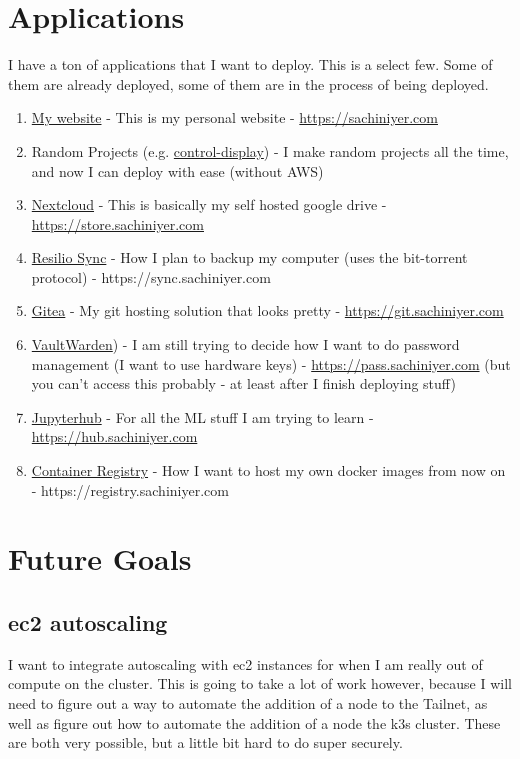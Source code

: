 \documentclass[12pt]{article}
\begin{document}
\section{Applications}
I have a ton of applications that I want to deploy. This is a select few. Some of them are already deployed, some of them are in the process of being deployed.
\begin{enumerate}
    \item \href{https://sachiniyer.com}{My website} - This is my personal website - \href{https://sachiniyer.com}{https://sachiniyer.com}
    \item Random Projects (e.g. \href{https://school-demo.sachiniyer.com}{control-display}) - I make random projects all the time, and now I can deploy with ease (without AWS)
    \item \href{https://nextcloud.com}{Nextcloud} - This is basically my self hosted google drive - \href{https://store.sachiniyer.com}{https://store.sachiniyer.com}
    \item \href{https://resilio.com}{Resilio Sync} - How I plan to backup my computer (uses the bit-torrent protocol) - https://sync.sachiniyer.com
    \item \href{https://gitea.io}{Gitea} - My git hosting solution that looks pretty - \href{https://git.sachiniyer.com}{https://git.sachiniyer.com}
    \item \href{https://github.com/dani-garcia/vaultwarden}{VaultWarden}) - I am still trying to decide how I want to do password management (I want to use hardware keys) - \href{https://pass.sachiniyer.com}{https://pass.sachiniyer.com} (but you can't access this probably - at least after I finish deploying stuff)
    \item \href{https://jupyterhub.readthedocs.io/en/stable/installation-guide.html}{Jupyterhub} - For all the ML stuff I am trying to learn - \href{https://hub.sachiniyer.com}{https://hub.sachiniyer.com}
    \item \href{https://docs.docker.com/registry/}{Container Registry} - How I want to host my own docker images from now on - https://registry.sachiniyer.com
\end{enumerate}

\section{Future Goals}
\subsection{ec2 autoscaling}
I want to integrate autoscaling with ec2 instances for when I am really out of compute on the cluster. This is going to take a lot of work however, because I will need to figure out a way to automate the addition of a node to the Tailnet, as well as figure out how to automate the addition of a node the k3s cluster. These are both very possible, but a little bit hard to do super securely.
\end{document}
